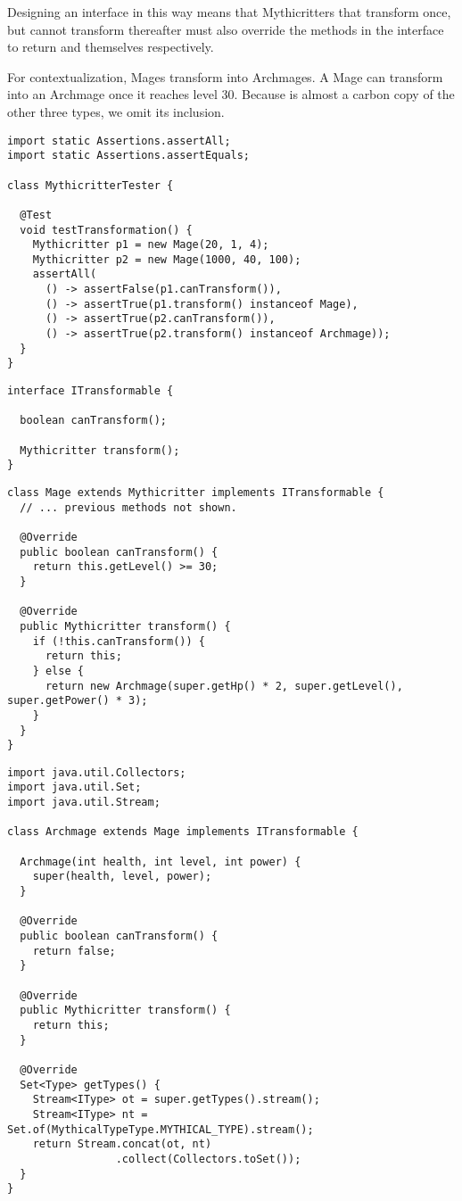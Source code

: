 Designing an interface in this way means that Mythicritters that transform once, but cannot transform thereafter must also override the methods in the  interface to return  and themselves respectively.

For contextualization, Mages transform into Archmages. A Mage can transform into an Archmage once it reaches level 30. Because  is almost a carbon copy of the other three types, we omit its inclusion.

\begin{lstlisting}[language=MyJava]
import static Assertions.assertAll;
import static Assertions.assertEquals;

class MythicritterTester {

  @Test 
  void testTransformation() {
    Mythicritter p1 = new Mage(20, 1, 4);
    Mythicritter p2 = new Mage(1000, 40, 100);
    assertAll(
      () -> assertFalse(p1.canTransform()),
      () -> assertTrue(p1.transform() instanceof Mage),
      () -> assertTrue(p2.canTransform()),
      () -> assertTrue(p2.transform() instanceof Archmage));
  }
}
\end{lstlisting}

\begin{lstlisting}[language=MyJava]
interface ITransformable {

  boolean canTransform();

  Mythicritter transform();
}
\end{lstlisting}

\begin{lstlisting}[language=MyJava]
class Mage extends Mythicritter implements ITransformable {
  // ... previous methods not shown.

  @Override
  public boolean canTransform() {
    return this.getLevel() >= 30;
  }

  @Override
  public Mythicritter transform() {
    if (!this.canTransform()) {
      return this;
    } else {
      return new Archmage(super.getHp() * 2, super.getLevel(), super.getPower() * 3);
    }
  }
}
\end{lstlisting}

\enlargethispage{-3\baselineskip}
\begin{lstlisting}[language=MyJava]
import java.util.Collectors;
import java.util.Set;
import java.util.Stream;

class Archmage extends Mage implements ITransformable {

  Archmage(int health, int level, int power) {
    super(health, level, power);
  }

  @Override 
  public boolean canTransform() {
    return false;
  }

  @Override
  public Mythicritter transform() {
    return this;
  }

  @Override
  Set<Type> getTypes() {
    Stream<IType> ot = super.getTypes().stream();
    Stream<IType> nt = Set.of(MythicalTypeType.MYTHICAL_TYPE).stream();
    return Stream.concat(ot, nt)
                 .collect(Collectors.toSet());
  }
}
\end{lstlisting}

